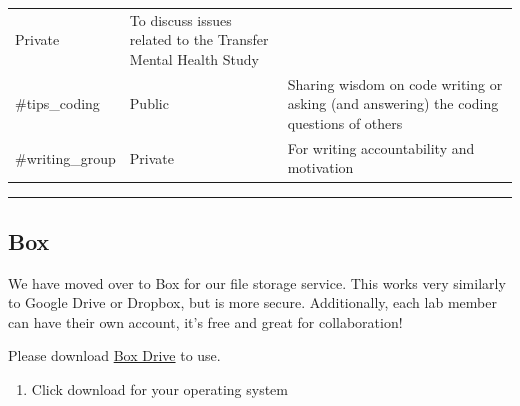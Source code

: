 \documentclass[]{book}
\providecommand{\tightlist}{%
  \setlength{\itemsep}{0pt}\setlength{\parskip}{0pt}}
\begin{document}
\begin{longtable}[]{@{}lll@{}}
\begin{minipage}[t]{0.04\columnwidth}
Private\strut
\end{minipage} & \begin{minipage}[t]{0.70\columnwidth}\raggedright
To discuss issues related to the Transfer Mental Health Study\strut
\end{minipage}\tabularnewline
\begin{minipage}[t]{0.18\columnwidth}\raggedright
\#tips\_coding\strut
\end{minipage} & \begin{minipage}[t]{0.04\columnwidth}\raggedright
Public\strut
\end{minipage} & \begin{minipage}[t]{0.70\columnwidth}\raggedright
Sharing wisdom on code writing or asking (and answering) the coding questions of others\strut
\end{minipage}\tabularnewline
\begin{minipage}[t]{0.18\columnwidth}\raggedright
\#writing\_group\strut
\end{minipage} & \begin{minipage}[t]{0.04\columnwidth}\raggedright
Private\strut
\end{minipage} & \begin{minipage}[t]{0.70\columnwidth}\raggedright
For writing accountability and motivation\strut
\end{minipage}\tabularnewline
\bottomrule
\end{longtable}

\begin{center}\rule{0.5\linewidth}{0.5pt}\end{center}

\hypertarget{box}{%
\subsection{Box}\label{box}}

We have moved over to Box for our file storage service. This works very similarly to Google Drive or Dropbox, but is more secure. Additionally, each lab member can have their own account, it's free and great for collaboration!

Please download \href{https://www.box.com/drive}{Box Drive} to use.

\begin{enumerate}
\def\labelenumi{\arabic{enumi}.}
\tightlist
\item
  Click download for your operating system
\end{enumerate}
\end{document}
